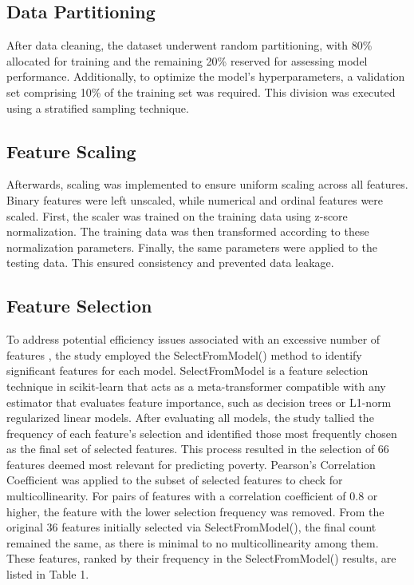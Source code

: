 \documentclass[a4paper,fleqn]{cas-sc}
\begin{document}
\subsection{Data Partitioning}
After data cleaning, the dataset underwent random partitioning, with 80\% allocated for training and the remaining 20\% reserved for assessing model performance. Additionally, to optimize the model's hyperparameters, a validation set comprising 10\% of the training set was required. This division was executed using a stratified sampling technique.

\subsection{Feature Scaling}
Afterwards, scaling was implemented to ensure uniform scaling across all features. Binary features were left unscaled, while numerical and ordinal features were scaled. First, the scaler was trained on the training data using z-score normalization. The training data was then transformed according to these normalization parameters. Finally, the same parameters were applied to the testing data. This ensured consistency and prevented data leakage.

\subsection{Feature Selection}
To address potential efficiency issues associated with an excessive number of features \citep{li2017feature}, the study employed the SelectFromModel() method to identify significant features for each model. SelectFromModel is a feature selection technique in scikit-learn that acts as a meta-transformer compatible with any estimator that evaluates feature importance, such as decision trees or L1-norm regularized linear models. After evaluating all models, the study tallied the frequency of each feature's selection and identified those most frequently chosen as the final set of selected features. This process resulted in the selection of 66 features deemed most relevant for predicting poverty. Pearson’s Correlation Coefficient was applied to the subset of selected features to check for multicollinearity. For pairs of features with a correlation coefficient of 0.8 or higher, the feature with the lower selection frequency was removed. From the original 36 features initially selected via SelectFromModel(), the final count remained the same, as there is minimal to no multicollinearity among them. These features, ranked by their frequency in the SelectFromModel() results, are listed in Table 1.
\end{document}
